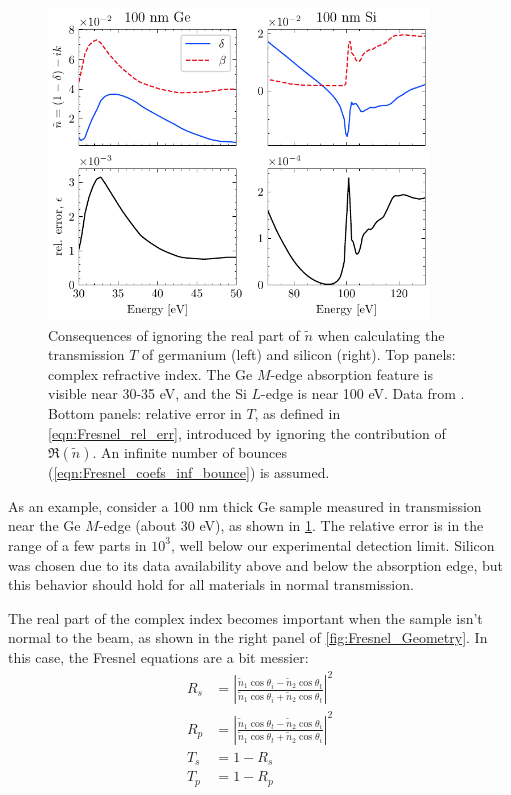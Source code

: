 \begin{figure}
	\centering
	\includegraphics[width=0.9\textwidth]{figures/chap1/Ge_Si_transmission_Fresnel.pdf}
	\caption{Consequences of ignoring the real part of $\tilde{n}$ when calculating the transmission $T$ of germanium (left) and silicon (right). Top panels: complex refractive index. The Ge $M$-edge absorption feature is visible near 30-35 eV, and the Si $L$-edge is near 100 eV. Data from \cite{gulliksonCXROXRayInteractions}. Bottom panels: relative error in $T$, as defined in \cref{eqn:Fresnel_rel_err}, introduced by ignoring the contribution of $\Re(\tilde{n})$. An infinite number of bounces (\cref{eqn:Fresnel_coefs_inf_bounce}) is assumed.}
	\label{fig:Ge_Si_transmission_Fresnel}
\end{figure}

As an example, consider a 100 nm thick Ge sample measured in transmission near the Ge $M$-edge (about 30 eV), as shown in \cref{fig:Ge_Si_transmission_Fresnel}. The relative error is in the range of a few parts in $10^3$, well below our experimental detection limit. Silicon was chosen due to its data availability above and below the absorption edge, but this behavior should hold for all materials in normal transmission.

The real part of the complex index becomes important when the sample isn't normal to the beam, as shown in the right panel of \cref{fig:Fresnel_Geometry}. In this case, the Fresnel equations are a bit messier:
\begin{equation}
\begin{aligned}
R_s &= \left| \frac{\tilde{n}_1 \cos \theta_i - \tilde{n}_2 \cos \theta_t}{\tilde{n}_1 \cos \theta_i + \tilde{n}_2 \cos \theta_t}  \right|^2 \\
R_p &= \left| \frac{\tilde{n}_1 \cos \theta_t - \tilde{n}_2 \cos \theta_i}{\tilde{n}_1 \cos \theta_t + \tilde{n}_2 \cos \theta_i}  \right|^2 \\
T_s &= 1 - R_s \\
T_p &= 1 - R_p \\
\end{aligned}
\label{eqn:Fresnel_nonnormal}
\end{equation}

